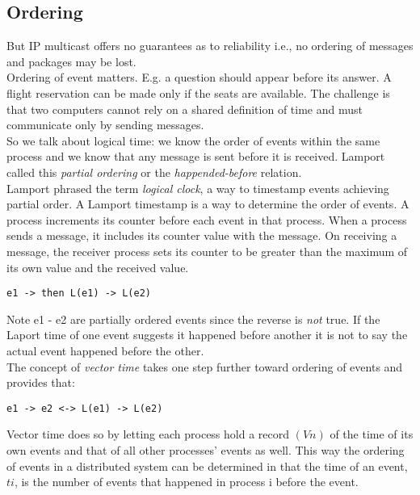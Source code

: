 \subsection{Ordering}

But IP multicast offers no guarantees as to reliability i.e., no ordering of messages and packages may be lost. \\

Ordering of event matters. E.g. a question should appear before its answer. A flight reservation can be made only if the seats are available. The challenge is that two computers cannot rely on a shared definition of time and must communicate only by sending messages. \\ 

So we talk about logical time: we know the order of events within the same process and we know that any message is sent before it is received. Lamport called this \emph{partial ordering } or the \emph{happended-before} relation.\\

Lamport phrased the term \emph{logical clock}, a way to timestamp events achieving partial order. A Lamport timestamp is a way to determine the order of events. A process increments its counter before each event in that process. When a process sends a message, it includes its counter value with the message. On receiving a message, the receiver process sets its counter to be greater than the maximum of its own value and the received value. 

\begin{lstlisting}
e1 -> then L(e1) -> L(e2)
\end{lstlisting}

Note e1 - e2 are partially ordered events since the reverse is \emph{not} true. If the Laport time of one event suggests it happened before another it is not to say the actual event happened before the other.\\

The concept of \emph{vector time} takes one step further toward ordering of events and provides that:

\begin{lstlisting}
e1 -> e2 <-> L(e1) -> L(e2)
\end{lstlisting}

Vector time does so by letting each process hold a record   $(Vn)$ of the time of its own events and that of all other processes' events as well. This way the ordering of events in a distributed system can be determined in that the time of an event, $ti$, is the number of events that happened in process i before the event.\\

